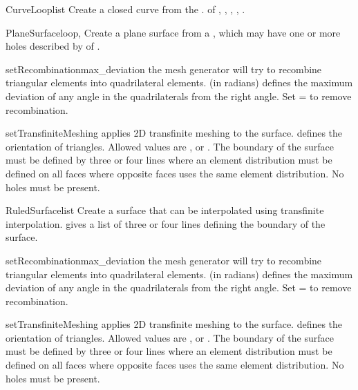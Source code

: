 \begin{classdesc}{CurveLoop}{list}
Create a closed curve from the . of
, , , ,
.
\end{classdesc}

\begin{classdesc}{PlaneSurface}{loop, }
Create a plane surface from a , which may have one or more holes
described by  of .
\end{classdesc}
\begin{methoddesc}[PlaneSurface]{setRecombination}{max_deviation}
the mesh generator will try to recombine triangular elements 
into quadrilateral elements.  (in radians) defines the
maximum deviation of any angle in the quadrilaterals from the right angle.  
Set = to remove recombination.
\end{methoddesc}
\begin{methoddesc}[PlaneSurface]{setTransfiniteMeshing}{}
applies 2D transfinite meshing to the surface. 
 defines the orientation of triangles. Allowed values
are ,  or . The 
boundary of the surface must be defined by three or four lines where an
element distribution must be defined on all faces where opposite 
faces uses the same element distribution. No holes must be present.
\end{methoddesc}



\begin{classdesc}{RuledSurface}{list}
Create a surface that can be interpolated using transfinite interpolation.
 gives a list of three or four lines defining the boundary of the
surface.
\end{classdesc}
\begin{methoddesc}[RuledSurface]{setRecombination}{max_deviation}
the mesh generator will try to recombine triangular elements 
into quadrilateral elements.  (in radians) defines the
maximum deviation of any angle in the quadrilaterals from the right angle.  
Set = to remove recombination.
\end{methoddesc}
\begin{methoddesc}[RuledSurface]{setTransfiniteMeshing}{}
applies 2D transfinite meshing to the surface. 
 defines the orientation of triangles. Allowed values
are ,  or . The 
boundary of the surface must be defined by three or four lines where an
element distribution must be defined on all faces where opposite 
faces uses the same element distribution. No holes must be present.
\end{methoddesc}


